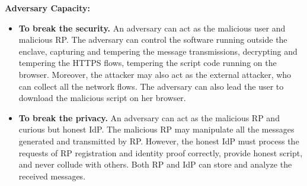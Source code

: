 \vspace{1mm}\noindent\textbf{Adversary Capacity: }
\begin{itemize}
\item \noindent\textbf{To break the security.}
An adversary can act as the malicious user and malicious RP.
The adversary can control the software running outside the enclave, capturing and tempering the message transmissions, decrypting and tempering the HTTPS flows, tempering the script code running on the browser.
Moreover, the attacker may also act as the external attacker, who can collect all the network flows. The adversary can also lead the user to download the malicious script on her browser.

\item \noindent\textbf{To break the privacy.}
An adversary can act as the malicious RP and curious but honest IdP.
The malicious RP may manipulate  all the messages generated and transmitted by RP.
However, the honest IdP must process the requests of RP registration and identity proof correctly, provide honest script, and never collude with others.
Both RP and IdP can store and analyze the received messages.

\end{itemize}

